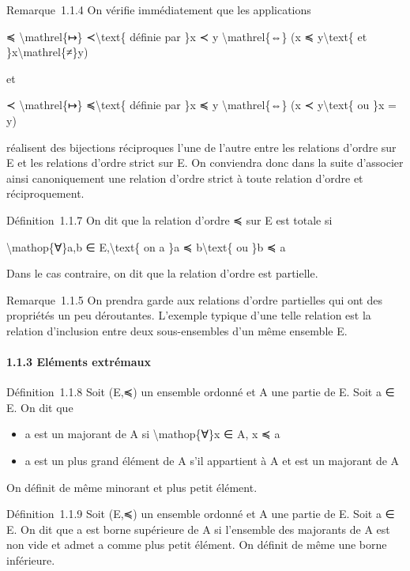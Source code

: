 \documentclass[]{article}
\begin{document}
Remarque~1.1.4 On vérifie immédiatement que les applications

≼ \textbackslash{}mathrel\{↦\} ≺\textbackslash{}text\{ définie par \}x ≺
y \textbackslash{}mathrel\{⇔\} (x ≼ y\textbackslash{}text\{ et
\}x\textbackslash{}mathrel\{≠\}y)

et

≺ \textbackslash{}mathrel\{↦\} ≼\textbackslash{}text\{ définie par \}x ≼
y \textbackslash{}mathrel\{⇔\} (x ≺ y\textbackslash{}text\{ ou \}x = y)

réalisent des bijections réciproques l'une de l'autre entre les
relations d'ordre sur E et les relations d'ordre strict sur E. On
conviendra donc dans la suite d'associer ainsi canoniquement une
relation d'ordre strict à toute relation d'ordre et réciproquement.

Définition~1.1.7 On dit que la relation d'ordre ≼ sur E est totale si

\textbackslash{}mathop\{∀\}a,b ∈ E,\textbackslash{}text\{ on a \}a ≼
b\textbackslash{}text\{ ou \}b ≼ a

Dans le cas contraire, on dit que la relation d'ordre est partielle.

Remarque~1.1.5 On prendra garde aux relations d'ordre partielles qui ont
des propriétés un peu déroutantes. L'exemple typique d'une telle
relation est la relation d'inclusion entre deux sous-ensembles d'un même
ensemble E.

\paragraph{1.1.3 Eléments extrémaux}

Définition~1.1.8 Soit (E,≼) un ensemble ordonné et A une partie de E.
Soit a ∈ E. On dit que

\begin{itemize}
\itemsep1pt\parskip0pt
\item
  a est un majorant de A si \textbackslash{}mathop\{∀\}x ∈ A, x ≼ a
\item
  a est un plus grand élément de A s'il appartient à A et est un
  majorant de A
\end{itemize}

On définit de même minorant et plus petit élément.

Définition~1.1.9 Soit (E,≼) un ensemble ordonné et A une partie de E.
Soit a ∈ E. On dit que a est borne supérieure de A si l'ensemble des
majorants de A est non vide et admet a comme plus petit élément. On
définit de même une borne inférieure.
\end{document}
